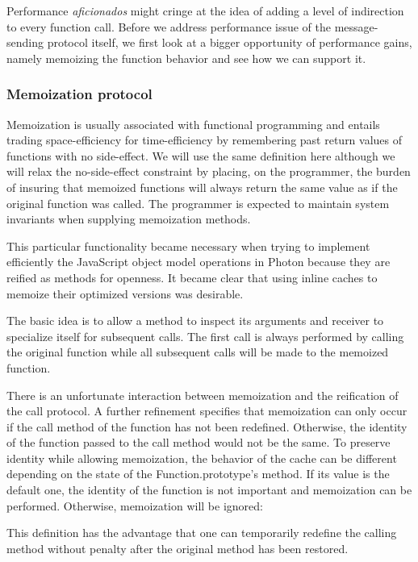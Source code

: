 Performance \textit{aficionados} might cringe at the idea of adding a level of
indirection to every function call. Before we address performance issue of the
message-sending protocol itself, we first look at a bigger opportunity of
performance gains, namely memoizing the function behavior and see how we can
support it.

\subsubsection{Memoization protocol}

Memoization is usually associated with functional programming and entails
trading space-efficiency for time-efficiency by remembering past return values
of functions with no side-effect. We will use the same definition here although
we will relax the no-side-effect constraint by placing, on the programmer, the
burden of insuring that memoized functions will always return the same value as
if the original function was called. The programmer is expected to maintain
system invariants when supplying memoization methods.

This particular functionality became necessary when trying to implement
efficiently the JavaScript object model operations in Photon because they are
reified as methods for openness. It became clear that using inline caches to
memoize their optimized versions was desirable.

The basic idea is to allow a method to inspect its arguments and receiver to
specialize itself for subsequent calls. The first call is always performed by
calling the original function while all subsequent calls will be made to the
memoized function.

There is an unfortunate interaction between memoization and the reification of
the call protocol. A further refinement specifies that memoization can only
occur if the call method of the function has not been redefined. Otherwise, the
identity of the function passed to the call method would not be the same. To
preserve identity while allowing memoization, the behavior of the cache can be
different depending on the state of the {Function.prototype}'s 
method. If its value is the default one, the identity of the function is not
important and memoization can be performed. Otherwise, memoization will be
ignored:


This definition has the advantage that one can temporarily redefine the calling
method without penalty after the original method has been restored.

